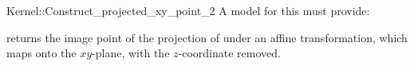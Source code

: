 \begin{ccRefFunctionObjectConcept}{Kernel::Construct_projected_xy_point_2}
A model for this must provide:


       {returns the image point of the projection of  under an affine
        transformation, which maps  onto the $xy$-plane, with the
        $z$-coordinate removed.}

\ccIsModel{}

\end{ccRefFunctionObjectConcept}
